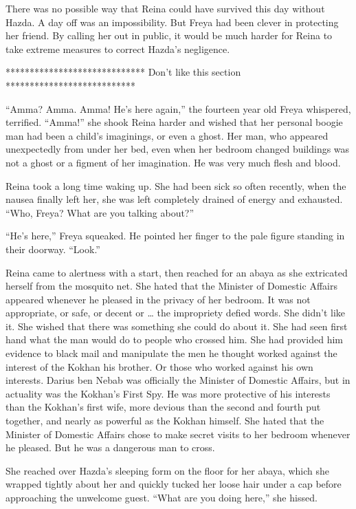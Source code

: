 \documentclass{article}
\begin{document}
	There was no possible way that Reina could have survived this day without Hazda. A day off was an impossibility. But Freya had been clever in protecting her friend. By calling her out in public, it would be much harder for Reina to take extreme measures to correct Hazda’s negligence.
	
	
	
	*****************************
	Don’t like this section 
	***************************
	
	“Amma? Amma. Amma! He’s here again,” the fourteen year old Freya whispered, terrified. “Amma!” she shook Reina harder and wished that her personal boogie man had been a child’s imaginings, or even a ghost. Her man, who appeared unexpectedly from under her bed, even when her bedroom changed buildings was not a ghost or a figment of her imagination. He was very much flesh and blood. 
	
	Reina took a long time waking up. She had been sick so often recently, when the nausea finally left her, she was left completely drained of energy and exhausted. “Who, Freya? What are you talking about?”
	
	“He’s here,” Freya squeaked. He pointed her finger to the pale figure standing in their doorway. “Look.”
	
	
	Reina came to alertness with a start, then reached for an abaya as she extricated herself from the mosquito net. She hated that the Minister of Domestic Affairs appeared whenever he pleased in the privacy of her bedroom. It was not appropriate, or safe, or decent or … the impropriety defied words. She didn’t like it. She wished that there was something she could do about it. She had seen first hand what the man would do to people who crossed him. She had provided him evidence to black mail and manipulate the men he thought worked against the interest of the Kokhan his brother. Or those who worked against his own interests. Darius ben Nebab was officially the Minister of Domestic Affairs, but in actuality was the Kokhan’s First Spy. He was more protective of his interests than the Kokhan’s first wife, more devious than the second and fourth put together, and nearly as powerful as the Kokhan himself. She hated that the Minister of Domestic Affairs chose to make secret visits to her bedroom whenever he pleased. But he was a dangerous man to cross.
	
	She reached over Hazda’s sleeping form on the floor for her abaya, which she wrapped tightly about her and quickly tucked her loose hair under a cap before approaching the unwelcome guest. “What are you doing here,” she hissed. 
	
\end{document}

